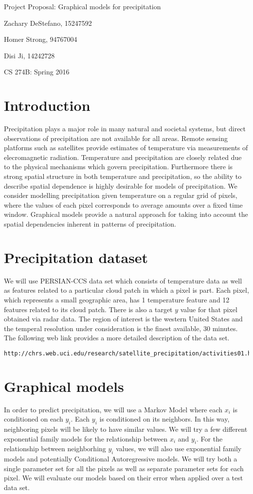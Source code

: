 \documentclass[twoside,11pt]{article}
\theoremstyle{definition}
\begin{document}
\centerline{\Large Project Proposal: Graphical models for precipitation}
\centerline{Zachary DeStefano, 15247592}
\centerline{Homer Strong, 94767004}
\centerline{Disi Ji, 14242728}
\centerline{CS 274B: Spring 2016}

\section*{Introduction}
Precipitation plays a major role in many natural and societal systems, but direct observations of precipitation are not available for all areas. Remote sensing platforms such as satellites provide estimates of temperature via measurements of elecromagnetic radiation. Temperature and precipitation are closely related due to the physical mechanisms which govern precipitation. Furthermore there is strong spatial structure in both temperature and precipitation, so the ability to describe spatial dependence is highly desirable for models of precipitation. We consider modelling precipitation given temperature on a regular grid of pixels, where the values of each pixel corresponds to average amounts over a fixed time window. Graphical models provide a natural approach for taking into account the spatial dependencies inherent in patterns of precipitation.

\section*{Precipitation dataset}
We will use PERSIAN-CCS data set which consists of temperature data as well as features related to a particular cloud patch in which a pixel is part. Each pixel, which represents a small geographic area, has 1 temperature feature and 12 features related to its cloud patch. There is also a target $y$ value for that pixel obtained via radar data. The region of interest is the western United States and the temperal resolution under consideration is the finest available, 30 minutes. The following web link provides a more detailed description of the data set. 

\begin{lstlisting}
http://chrs.web.uci.edu/research/satellite_precipitation/activities01.html
\end{lstlisting}

\section*{Graphical models}
In order to predict precipitation, we will use a Markov Model where each $x_i$ is conditioned on each $y_i$. Each $y_i$ is conditioned on its neighbors. In this way, neighboring pixels will be likely to have similar values. We will try a few different exponential family models for the relationship between $x_i$ and $y_i$. For the relationship between neighborhing $y_i$ values, we will also use exponential family models and potentially Conditional Autoregressive models. We will try both a single parameter set for all the pixels as well as separate parameter sets for each pixel. We will evaluate our models based on their error when applied over a test data set. 
\end{document}
